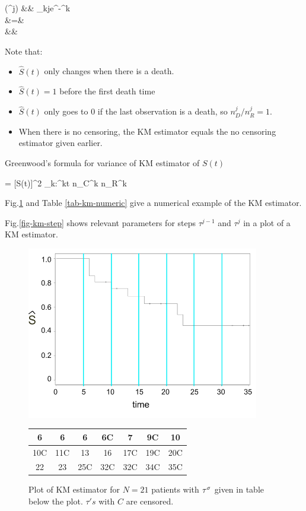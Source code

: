\beqa
{}(\tau^j) &\approx&
\prod_{k\leq j}e^{-\hat{\lam}^k}
\\
&=&
\\
&\approx&
\eeqa

Note that:
\begin{itemize}
\item $\hat{S}(t)$ only changes when there is a death.
\item $\hat{S}(t)=1$ before the first death time
\item $\hat{S}(t)$ only goes to 0 if the last observation is a death,
so $n_D^j/n_R^j=1$.
\item When there is no censoring, the KM estimator equals
the no censoring estimator given earlier.
\end{itemize}

Greenwood's formula
for variance of KM estimator of $S(t)$

\beq
{}=
[S(t)]^2
\sum_{k:\tau^k\leq t}
{ n_C^k n_R^k}
\eeq

Fig.\ref{fig-kn-graph}
and Table \ref{tab-km-numeric} give a numerical
example of the
 KM estimator.

Fig.\ref{fig-km-step}
shows relevant parameters
for steps $\tau^{j-1}$ and $\tau^j$
in a plot of a KM estimator.





\newpage
 \begin{figure}[h!]
\centering
\includegraphics[width=4in]
{survival/km-graph.png}
\begin{tabular}{|c|c|c|c|c|c|c|}
\hline\hline
6& 6& 6& 6C& 7& 9C& 10\\
\hline
10C&11C& 13& 16& 17C& 19C& 20C\\
\hline
 22& 23& 25C& 32C& 32C& 34C& 35C\\
 \hline
 \end{tabular}
\caption{Plot of KM estimator for
$N=21$ patients
with $\tau^\sigma$ given in table
below the plot.
$\tau's$ with $C$
 are censored.}
\label{fig-kn-graph}
\end{figure}

